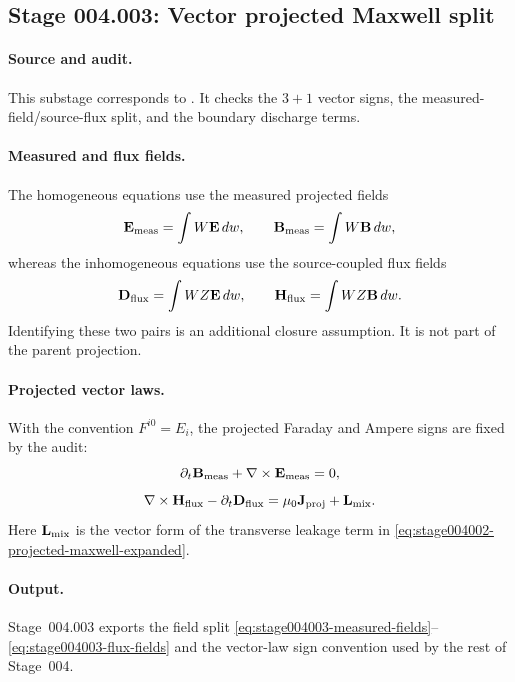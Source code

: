 \subsection*{Stage 004.003: Vector projected Maxwell split}
\label{subsec:stage004003-projected-maxwell-vector}

\paragraph{Source and audit.}
This substage corresponds to
.
It checks the \(3+1\) vector signs, the measured-field/source-flux split, and
the boundary discharge terms.

\paragraph{Measured and flux fields.}
The homogeneous equations use the measured projected fields
\begin{equation}
\label{eq:stage004003-measured-fields}
\mathbf E_{\rm meas}=\int W\mathbf E\,dw,
\qquad
\mathbf B_{\rm meas}=\int W\mathbf B\,dw,
\end{equation}
whereas the inhomogeneous equations use the source-coupled flux fields
\begin{equation}
\label{eq:stage004003-flux-fields}
\mathbf D_{\rm flux}=\int WZ\mathbf E\,dw,
\qquad
\mathbf H_{\rm flux}=\int WZ\mathbf B\,dw.
\end{equation}
Identifying these two pairs is an additional closure assumption.  It is not
part of the parent projection.

\paragraph{Projected vector laws.}
With the convention \(F^{i0}=E_i\), the projected Faraday and Ampere signs are
fixed by the audit:
\begin{equation}
\partial_t\mathbf B_{\rm meas}+\nabla\times\mathbf E_{\rm meas}=0,
\end{equation}
\begin{equation}
\label{eq:stage004003-ampere}
\nabla\times\mathbf H_{\rm flux}-\partial_t\mathbf D_{\rm flux}
=\mu_0\mathbf J_{\rm proj}+\mathbf L_{\rm mix}.
\end{equation}
Here \(\mathbf L_{\rm mix}\) is the vector form of the transverse leakage term
in \eqref{eq:stage004002-projected-maxwell-expanded}.

\paragraph{Output.}
Stage~004.003 exports the field split
\eqref{eq:stage004003-measured-fields}--\eqref{eq:stage004003-flux-fields}
and the vector-law sign convention used by the rest of Stage~004.
